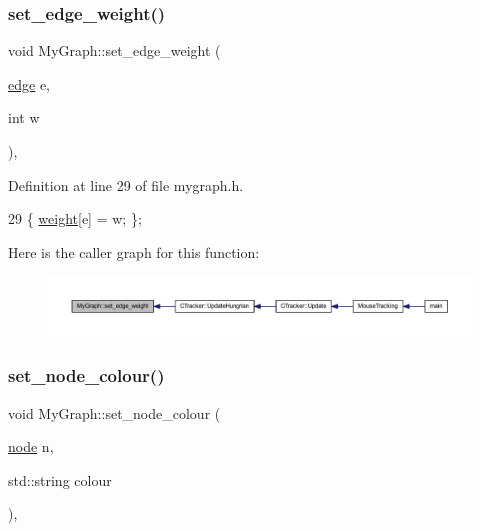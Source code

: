 \subsubsection{\texorpdfstring{set\+\_\+edge\+\_\+weight()}{set\_edge\_weight()}}
{\footnotesize\ttfamily void My\+Graph\+::set\+\_\+edge\+\_\+weight (\begin{DoxyParamCaption}\item[{\mbox{\hyperlink{classedge}{edge}}}]{e,  }\item[{int}]{w }\end{DoxyParamCaption})\hspace{0.3cm}{\ttfamily [inline]}, {\ttfamily [inherited]}}



Definition at line 29 of file mygraph.\+h.


\begin{DoxyCode}
29 \{ \mbox{\hyperlink{class_my_graph_aa6e12f16153220780e9db1eb30112b34}{weight}}[e] = w; \};
\end{DoxyCode}
Here is the caller graph for this function\+:
\nopagebreak
\begin{figure}[H]
\begin{center}
\leavevmode
\includegraphics[width=350pt]{class_my_graph_a798846d9c09d7d5b49db3c75fb1f7f38_icgraph}
\end{center}
\end{figure}
\mbox{\label{class_my_graph_a4cada42859b2a657637e81eef7c6e4ab}} 
\subsubsection{\texorpdfstring{set\+\_\+node\+\_\+colour()}{set\_node\_colour()}}
{\footnotesize\ttfamily void My\+Graph\+::set\+\_\+node\+\_\+colour (\begin{DoxyParamCaption}\item[{\mbox{\hyperlink{classnode}{node}}}]{n,  }\item[{std\+::string}]{colour }\end{DoxyParamCaption})\hspace{0.3cm}{\ttfamily [inline]}, {\ttfamily [inherited]}}



